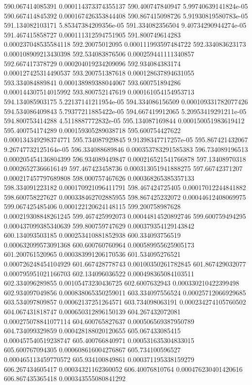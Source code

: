 {590.067414085391 0.000114373374355137
590.400747840947 5.99740639141824e-05
590.667414845392 0.000167426353844408
590.867415098726 5.91930819580783e-05
591.134082103171 5.85347384209356e-05
591.334082356504 9.40734290944274e-05
591.467415858727 0.000111312594751905
591.800749614283 0.000237048535584118
592.20075012095 0.000111993597484722
592.334083623173 0.000108909213430398
592.534083876506 0.000259441111340857
592.667417378729 0.000204019234209096
592.934084383174 0.000127425314490537
593.200751387618 0.000128637894631055
593.334084889841 0.000138989388044067
593.600751894286 0.000144307514015992
593.800752147619 0.000161054154953713
594.134085903175 5.22137141211954e-05
594.334086156509 0.000109331782077426
594.534086409843 5.79377211885422e-05
594.667419912065 5.20953419291211e-05
594.800753414288 4.5118887772832e-05
595.134087169844 0.000150051983619412
595.400754174289 0.000159305289038718
595.600754427622 0.000134349298374771
595.734087929845 9.91398347717257e-05
595.867421432067 9.26747732125164e-05
596.334088689846 0.000353783291585383
596.734089196513 0.000205454136804399
596.934089449847 0.000216521541766878
597.13408970318 0.00026527366616149
597.467423458736 0.000313051941888275
597.66742371207 0.000217457797689808
598.000757467626 0.000368265385357133
598.334091223182 0.000170921096411791
598.467424725405 0.00017012244841882
598.600758227627 0.000338462702885955
598.867425232072 0.00044612408069975
599.067425485406 0.000122120624148115
599.200758987628 0.000219308848261245
599.467425992073 0.00044814520892746
599.600759494295 0.000437099385340639
599.800759747629 0.000379354129143842
600.134093503185 0.000253410881852938
600.334093756519 0.000632099573091368
600.600760760964 0.000589955625905173
601.200761520965 0.000383991206170536
601.534095276521 0.000726248454104929
601.667428778743 0.00100350261782845
601.867429032077 0.000795951021166703
602.134096036522 0.000498365084103511
602.334096289855 0.00105473230436725
602.6007632943 0.000330210422399498
602.934097049856 0.000838065350259011
603.334097556524 0.00025712066929685
603.534097809857 0.00062137251264571
603.734098063191 0.000234274105760502
604.067431818747 0.000650312896150139
604.267432072081 0.000275078841077114
604.600765827637 0.000506569387950789
604.734099329859 0.000428188020120655
605.067433085415 0.000457540519238747
605.400766840971 0.000531635304833015
605.600767094305 0.000608616004276867
605.734100596527 0.000465113459770572
605.934100849861 0.000371195338159279
606.267434605417 0.00034321162360052
606.40076810764 0.000476230401420616
606.867435365418 0.000343555080841292
}
